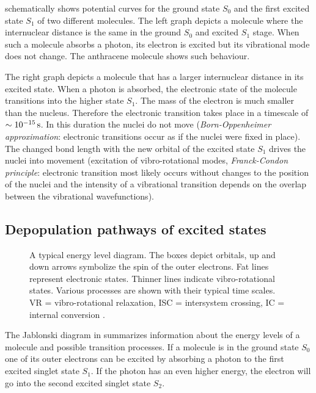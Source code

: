  schematically shows potential curves for the
ground state $S_0$ and the first excited state $S_1$ of two different
molecules. The left graph depicts a molecule where the internuclear
distance is the same in the ground $S_0$ and excited $S_1$ stage. When
such a molecule absorbs a photon, its electron is excited but its
vibrational mode does not change. The anthracene molecule shows such
behaviour.

The right graph depicts a molecule that has a larger internuclear
distance in its excited state. When a photon is absorbed, the
electronic state of the molecule transitions into the higher state
$S_1$. The mass of the electron is much smaller than the
nucleus. Therefore the electronic transition takes place in a
timescale of $\unit[\sim10^{-15}]{s}$. In this duration the nuclei do
not move (\emph{Born-Oppenheimer approximation}: electronic
transitions occur as if the nuclei were fixed in place). The changed
bond length with the new orbital of the excited state $S_1$ drives the
nuclei into movement (excitation of vibro-rotational modes,
\emph{Franck-Condon principle}: electronic transition most likely
occurs without changes to the position of the nuclei and the intensity
of a vibrational transition depends on the overlap between the
vibrational wavefunctions).

\subsection{Depopulation pathways of excited states}
\begin{figure}[!hbt]
  \centering
  \def\svgscale{.8}
  {\small
  }
  \caption{A typical energy level diagram. The boxes depict orbitals,
    up and down arrows symbolize the spin of the outer electrons. Fat
    lines represent electronic states. Thinner lines indicate
    vibro-rotational states. Various processes are shown with their
    typical time scales. VR = vibro-rotational relaxation, ISC =
    intersystem crossing, IC = internal conversion \cite[inspired
    from][]{Haken2006}.}
  \label{fig:flu-level}
\end{figure}
The Jablonski diagram in  summarizes information
about the energy levels of a molecule and possible transition
processes. If a molecule is in the ground state $S_0$ one of its outer
electrons can be excited by absorbing a photon to the first excited
singlet state $S_1$.  If the photon has an even higher energy, the
electron will go into the second excited singlet state $S_2$.

